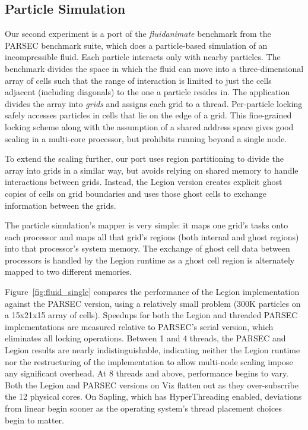 \subsection{Particle Simulation}
\label{subsec:exp_fluid}

Our second experiment is a port of the \emph{fluidanimate} benchmark
from the PARSEC benchmark suite\cite{bienia11benchmarking}, which does a
particle-based simulation of an incompressible fluid.  Each particle
interacts only with nearby particles. The benchmark divides the
space in which the fluid can move into a three-dimensional array of
cells such that the range of interaction is limited to just the cells
adjacent (including diagonals) to the one a particle resides in.  The
application divides the array into {\em grids} and assigns each grid to
a thread.  Per-particle locking safely accesses particles in
cells that lie on the edge of a grid.  This fine-grained locking
scheme along with the assumption of a shared address space gives
good scaling in a multi-core processor, but prohibits running
beyond a single node.

To extend the scaling further, our port uses region partitioning to
divide the array into grids in a similar way, but avoids relying
on shared memory to handle interactions between grids.
Instead, the Legion version creates
explicit ghost copies of cells on grid boundaries and uses
those ghost cells to exchange information between the grids.

The particle simulation's mapper is very simple: it maps one grid's
tasks onto each processor and maps all that grid's regions (both
internal and ghost regions) into that processor's system memory.  The
exchange of ghost cell data between processors is handled by the
Legion runtime as a ghost cell region is alternately mapped to two
different memories.

Figure~\ref{fig:fluid_single} compares the performance of the Legion
implementation against the PARSEC version, using a relatively small
problem (300K particles on a 15x21x15 array of cells).  Speedups for
both the Legion and threaded PARSEC implementations are measured 
relative to PARSEC's serial version, which eliminates all locking
operations.  Between 1 and
4 threads, the PARSEC and Legion results are nearly indistinguishable,
indicating neither the Legion runtime nor the restructuring of the
implementation to allow multi-node scaling impose any significant
overhead.
At 8 threads and above, performance begins to vary.  Both the Legion
and PARSEC versions on Viz flatten out as they over-subscribe the 12
physical cores.  On Sapling, which has HyperThreading enabled,
deviations from linear begin sooner as the operating system's
thread placement choices begin to matter.

